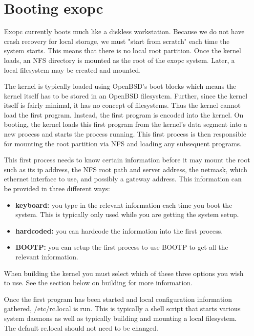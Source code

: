 \documentclass[11pt]{article}
\begin{document}
\section{Booting exopc}

Exopc currently boots much like a diskless workstation. Because we do
not have crash recovery for local storage, we must "start from
scratch" each time the system starts. This means that there is no
local root partition. Once the kernel loads, an NFS directory is
mounted as the root of the exopc system. Later, a local filesystem
may be created and mounted.

The kernel is typically loaded using OpenBSD's boot blocks which means
the kernel itself has to be stored in an OpenBSD filesystem. Further,
since the kernel itself is fairly minimal, it has no concept of
filesystems. Thus the kernel cannot load the first program. Instead,
the first program is encoded into the kernel. On booting, the kernel
loads this first program from the kernel's data segment into a new
process and starts the process running. This first process is then
responsible for mounting the root partition via NFS and loading any
subsequent programs.

This first process needs to know certain information before it may
mount the root such as its ip address, the NFS root path and server
address, the netmask, which ethernet interface to use, and possibly a
gateway address. This information can be provided in three different
ways:

\begin{itemize}
\item{\bf keyboard:} you type in the relevant information each time
you boot the system. This is typically only used while you are
getting the system setup.
\item{\bf hardcoded:} you can hardcode the information into the first
process. 
\item{\bf BOOTP:} you can setup the first process to use BOOTP to
get all the relevant information.
\end{itemize}

When building the kernel you must select which of these three options
you wish to use. See the section below on building for more information.

Once the first program has been started and local configuration
information gathered, /etc/rc.local is run. This is typically a shell
script that starts various system daemons as well as typically
building and mounting a local filesystem. The default rc.local should
not need to be changed.
\end{document}
